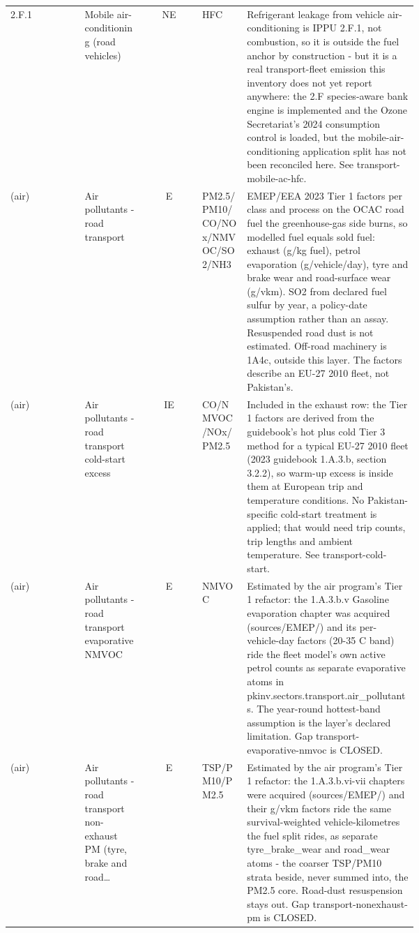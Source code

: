 {\begin{longtable}{@{}l>{\raggedright\arraybackslash}p{0.15\linewidth}c>{\raggedright\arraybackslash}p{0.11\linewidth}>{\raggedright\arraybackslash}p{0.42\linewidth}@{}}
2.F.1 & Mobile air-conditioning (road vehicles) & NE & HFC & Refrigerant leakage from vehicle air-conditioning is IPPU 2.F.1, not combustion, so it is outside the fuel anchor by construction - but it is a real transport-fleet emission this inventory does not yet report anywhere: the 2.F species-aware bank engine is implemented and the Ozone Secretariat's 2024 consumption control is loaded, but the mobile-air-conditioning application split has not been reconciled here. See transport-mobile-ac-hfc. \\[2pt]
(air) & Air pollutants - road transport & E & PM2.5/\allowbreak PM10/\allowbreak CO/\allowbreak NOx/\allowbreak NMVOC/\allowbreak SO2/\allowbreak NH3 & EMEP/EEA 2023 Tier 1 factors per class and process on the OCAC road fuel the greenhouse-gas side burns, so modelled fuel equals sold fuel: exhaust (g/kg fuel), petrol evaporation (g/vehicle/day), tyre and brake wear and road-surface wear (g/vkm). SO2 from declared fuel sulfur by year, a policy-date assumption rather than an assay. Resuspended road dust is not estimated. Off-road machinery is 1A4c, outside this layer. The factors describe an EU-27 2010 fleet, not Pakistan's. \\[2pt]
(air) & Air pollutants - road transport cold-start excess & IE & CO/\allowbreak NMVOC/\allowbreak NOx/\allowbreak PM2.5 & Included in the exhaust row: the Tier 1 factors are derived from the guidebook's hot plus cold Tier 3 method for a typical EU-27 2010 fleet (2023 guidebook 1.A.3.b, section 3.2.2), so warm-up excess is inside them at European trip and temperature conditions. No Pakistan-specific cold-start treatment is applied; that would need trip counts, trip lengths and ambient temperature. See transport-cold-start. \\[2pt]
(air) & Air pollutants - road transport evaporative NMVOC & E & NMVOC & Estimated by the air program's Tier 1 refactor: the 1.A.3.b.v Gasoline evaporation chapter was acquired (sources/EMEP/) and its per-vehicle-day factors (20-35 C band) ride the fleet model's own active petrol counts as separate evaporative atoms in pkinv.sectors.transport.air\_pollutants. The year-round hottest-band assumption is the layer's declared limitation. Gap transport-evaporative-nmvoc is CLOSED. \\[2pt]
(air) & Air pollutants - road transport non-exhaust PM (tyre, brake and road\ldots & E & TSP/\allowbreak PM10/\allowbreak PM2.5 & Estimated by the air program's Tier 1 refactor: the 1.A.3.b.vi-vii chapters were acquired (sources/EMEP/) and their g/vkm factors ride the same survival-weighted vehicle-kilometres the fuel split rides, as separate tyre\_brake\_wear and road\_wear atoms - the coarser TSP/PM10 strata beside, never summed into, the PM2.5 core. Road-dust resuspension stays out. Gap transport-nonexhaust-pm is CLOSED. \\[2pt]
\end{longtable}}
